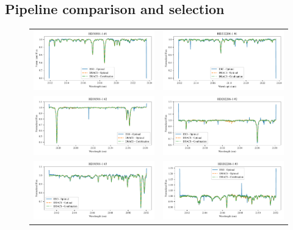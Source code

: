 \subsection{Pipeline comparison and selection}
\label{subsec:pipeline-selection}
\begin{figure}
    \begin{tabular}{cc}
        \includegraphics[width=0.5\linewidth]{figures/reduction/pipeline_compare/pipeline_compare_HD30501-1_chip_1} & \includegraphics[width=0.5\linewidth]{figures/reduction/pipeline_compare/pipeline_compare_HD202206-1_chip_1}\\
        \includegraphics[width=0.5\linewidth]{figures/reduction/pipeline_compare/pipeline_compare_HD30501-1_chip_2} & \includegraphics[width=0.5\linewidth]{figures/reduction/pipeline_compare/pipeline_compare_HD202206-1_chip_2}\\
        \includegraphics[width=0.5\linewidth]{figures/reduction/pipeline_compare/pipeline_compare_HD30501-1_chip_3} & \includegraphics[width=0.5\linewidth]{figures/reduction/pipeline_compare/pipeline_compare_HD202206-1_chip_3}\\

\end{tabular}
\end{figure}
